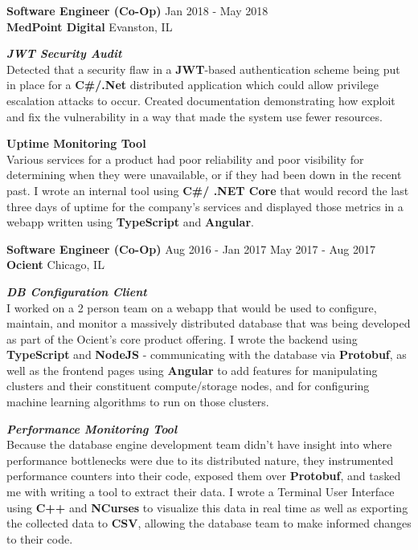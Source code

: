 \documentclass[a4paper]{article}
\begin{document}
\textbf{Software Engineer (Co-Op)}  \hfill Jan 2018 - May 2018\\
\textbf{MedPoint Digital} \hfill Evanston, IL
\begin{addmargin}[1em]{2em}%
    \textit{{\textbf{JWT Security Audit}}} \\
    Detected that a security flaw in a \textbf{JWT}-based authentication scheme being put in place for a \textbf{C\#/.Net} distributed application which could allow privilege escalation attacks to occur. 
Created documentation demonstrating how exploit and fix the vulnerability in a way that made the system use fewer resources.
\vspace*{2mm}

{\textbf{Uptime Monitoring Tool}} \\ 
Various services for a product had poor reliability and poor visibility for determining when they were unavailable, or if they had been down in the recent past. 
    I wrote an internal tool using \textbf{C\#/ .NET Core} that would record the last three days of uptime for the company's services and displayed those metrics in a webapp written using \textbf{TypeScript} and \textbf{Angular}.
\vspace*{2mm}
\end{addmargin}



\textbf{Software Engineer (Co-Op)}  \hfill Aug 2016 - Jan 2017 \textbar{} May 2017 - Aug 2017\\
\textbf{Ocient} \hfill Chicago, IL

\begin{addmargin}[1em]{2em}%
\textit{\textbf{DB Configuration Client}} \\
I worked on a 2 person team on a webapp that would be used to configure, maintain, and monitor a massively distributed database that was being developed as part of the Ocient’s core product offering.
    I wrote the backend using \textbf{TypeScript} and \textbf{NodeJS} - communicating with the database via \textbf{Protobuf}, as well as the frontend pages using \textbf{Angular} to add features for manipulating clusters and their constituent compute/storage nodes, and for configuring machine learning algorithms to run on those clusters.
\vspace*{2mm}

\textit{\textbf{Performance Monitoring Tool}} \\ 
    Because the database engine development team didn’t have insight into where performance bottlenecks were due to its distributed nature, they instrumented performance counters into their code, exposed them over \textbf{Protobuf}, and tasked me with writing a tool to extract their data. 
    I wrote a Terminal User Interface using \textbf{C++} and \textbf{NCurses} to visualize this data in real time as well as exporting the collected data to \textbf{CSV}, allowing the database team to make informed changes to their code.
\vspace*{2mm}
\end{addmargin}
\end{document}
